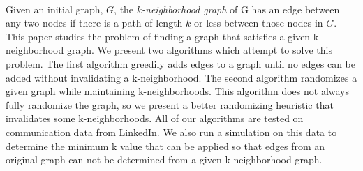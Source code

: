 
\\

\indent Given an initial graph, $G$, the \emph{$k$-neighborhood graph} of G has an edge between any two nodes if there is a path of length $k$ or less between those nodes in $G$. This paper studies the problem of finding a graph that satisfies a given k-neighborhood graph.  We present two algorithms which attempt to solve this problem. The first algorithm greedily adds edges to a graph until no edges can be added without invalidating a k-neighborhood. The second algorithm randomizes a given graph while maintaining k-neighborhoods. This algorithm does not always fully randomize the graph, so we present a better randomizing heuristic that invalidates some k-neighborhoods. All of our algorithms are tested on communication data from LinkedIn. We also run a simulation on this data to determine the minimum k value that can be applied so that edges from an original graph can not be determined from a given k-neighborhood graph. \\